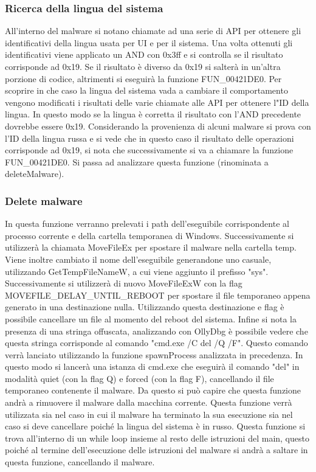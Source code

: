 \documentclass[a4paper,12pt]{article}
\begin{document}
\subsubsection{Ricerca della lingua del sistema}
All'interno del malware si notano chiamate ad una serie di API per ottenere gli identificativi della lingua usata per UI e per il sistema. Una volta ottenuti gli identificativi viene applicato un AND con 0x3ff e si controlla se il risultato corrisponde ad 0x19. Se il risultato è diverso da 0x19 si salterà in un'altra porzione di codice, altrimenti si eseguirà la funzione FUN\_00421DE0.
Per scoprire in che caso la lingua del sistema vada a cambiare il comportamento vengono modificati i risultati delle varie chiamate alle API per ottenere l"ID della lingua. In questo modo se la lingua è corretta il risultato con l'AND precedente dovrebbe essere 0x19.  
Considerando la provenienza di alcuni malware si prova con l'ID della lingua russa e si vede che in questo caso il risultato delle operazioni corrisponde ad 0x19, si nota che successivamente si va a chiamare la funzione FUN\_00421DE0. Si passa ad analizzare questa funzione (rinominata a deleteMalware). 

\subsubsection{Delete malware}
In questa funzione verranno prelevati i path dell'eseguibile corrispondente al processo corrente e della cartella temporanea di Windows. Successivamente si utilizzerà la chiamata MoveFileEx per spostare il malware nella cartella temp. Viene inoltre cambiato il nome dell'eseguibile generandone uno casuale, utilizzando GetTempFileNameW, a cui viene aggiunto il prefisso "sys".  Successivamente si utilizzerà di nuovo MoveFileExW con la flag MOVEFILE\_DELAY\_UNTIL\_REBOOT per spostare il file temporaneo appena generato in una destinazione nulla. Utilizzando questa destinazione e flag è possibile cancellare un file al momento del reboot del sistema. 
Infine si nota la presenza di una stringa offuscata, analizzando con OllyDbg è possibile vedere che questa stringa corrisponde al comando "cmd.exe /C del /Q /F". Questo comando verrà lanciato utilizzando la funzione spawnProcess analizzata in precedenza. In questo modo si lancerà una istanza di cmd.exe che eseguirà il comando "del" in modalità quiet (con la flag Q) e forced (con la flag F), cancellando il file temporaneo contenente il malware. Da questo si può capire che questa funzione andrà a rimuovere il malware dalla macchina corrente. Questa funzione verrà utilizzata sia nel caso in cui il malware ha terminato la sua esecuzione sia nel caso si deve cancellare poiché la lingua del sistema è in russo.  Questa funzione si trova all'interno di un while loop insieme al resto delle istruzioni del main, questo poiché al termine dell'esecuzione delle istruzioni del malware si andrà a saltare in questa funzione, cancellando il malware. 
\end{document}
